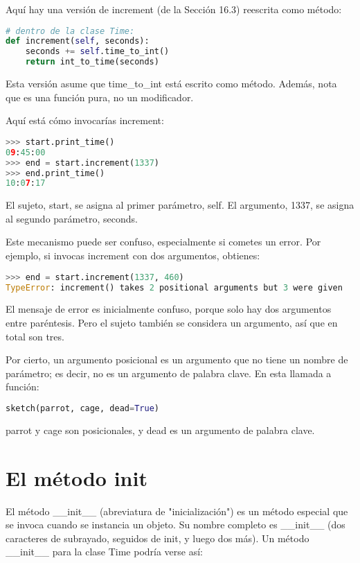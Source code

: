 Aquí hay una versión de increment (de la Sección 16.3) reescrita como método:

\begin{lstlisting}[language=Python]
# dentro de la clase Time:
def increment(self, seconds):
    seconds += self.time_to_int()
    return int_to_time(seconds)
\end{lstlisting}

Esta versión asume que time\_to\_int está escrito como método. Además, nota que es una función pura, no un modificador.

Aquí está cómo invocarías increment:

\begin{lstlisting}[language=Python]
>>> start.print_time()
09:45:00
>>> end = start.increment(1337)
>>> end.print_time()
10:07:17
\end{lstlisting}

El sujeto, start, se asigna al primer parámetro, self. El argumento, 1337, se asigna al segundo parámetro, seconds.

Este mecanismo puede ser confuso, especialmente si cometes un error. Por ejemplo, si invocas increment con dos argumentos, obtienes:

\begin{lstlisting}[language=Python]
>>> end = start.increment(1337, 460)
TypeError: increment() takes 2 positional arguments but 3 were given
\end{lstlisting}

El mensaje de error es inicialmente confuso, porque solo hay dos argumentos entre paréntesis. Pero el sujeto también se considera un argumento, así que en total son tres.

Por cierto, un argumento posicional es un argumento que no tiene un nombre de parámetro; es decir, no es un argumento de palabra clave. En esta llamada a función:

\begin{lstlisting}[language=Python]
sketch(parrot, cage, dead=True)
\end{lstlisting}

parrot y cage son posicionales, y dead es un argumento de palabra clave.

\section{El método init}

El método \_\_init\_\_ (abreviatura de "inicialización") es un método especial que se invoca cuando se instancia un objeto. Su nombre completo es \_\_init\_\_ (dos caracteres de subrayado, seguidos de init, y luego dos más). Un método \_\_init\_\_ para la clase Time podría verse así:

